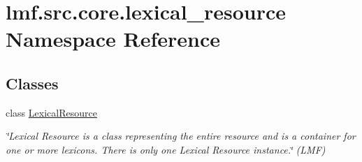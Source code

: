 \hypertarget{namespacelmf_1_1src_1_1core_1_1lexical__resource}{\section{lmf.\+src.\+core.\+lexical\+\_\+resource Namespace Reference}
\label{namespacelmf_1_1src_1_1core_1_1lexical__resource}
}
\subsection*{Classes}
\begin{DoxyCompactItemize}
\item 
class \hyperlink{classlmf_1_1src_1_1core_1_1lexical__resource_1_1_lexical_resource}{Lexical\+Resource}
\begin{DoxyCompactList}\small\item\em \char`\"{}\+Lexical Resource is a class representing the entire resource and is a container for one or more lexicons. There is only one Lexical Resource instance.\char`\"{} (L\+M\+F) \end{DoxyCompactList}\end{DoxyCompactItemize}
